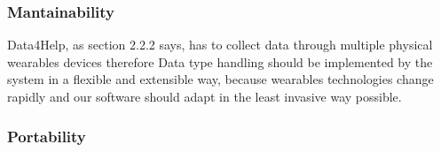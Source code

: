     \subsubsection{Mantainability}
Data4Help, as section 2.2.2 says, has to collect data through multiple physical wearables devices therefore 
Data type handling should be implemented by the system in a flexible and extensible way, because wearables technologies change rapidly and our software should adapt in the least invasive way possible.

    \subsubsection{Portability}











